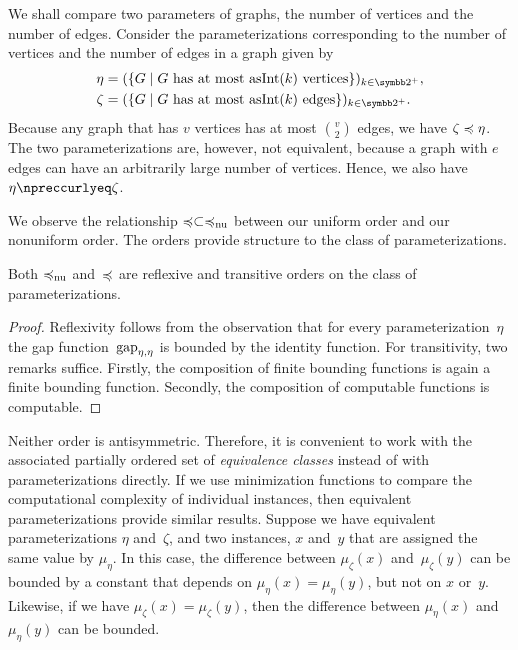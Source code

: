 \begin{example}
  We shall compare two parameters of graphs, the number of vertices and the number of edges.
  Consider the parameterizations corresponding to the number of vertices and the number of edges in a graph given by
  \begin{align*}
    \eta &= (\{G \st \text{$G$ has at most $\asNat(k)$ vertices}\})_{k \in \binary^+}, \\
    \zeta &= (\{G \st \text{$G$ has at most $\asNat(k)$ edges}\})_{k \in \binary^+}.
  \end{align*}
  Because any graph that has $v$ vertices has at most $\binom{v}{2}$ edges, we have $\zeta \preccurlyeq \eta$.
  The two parameterizations are, however, not equivalent, because a graph with $e$ edges can have an arbitrarily large number of vertices.
  Hence, we also have $\eta \notquasile \zeta$.
\end{example}

We observe the relationship $\preccurlyeq \subset \preccurlyeq_\mathrm{nu}$ between our uniform order and our nonuniform order.
The orders provide structure to the class of parameterizations.
\begin{lemma}
\label{lem:preorder}%
  Both $\preccurlyeq_\mathrm{nu}$ and~$\preccurlyeq$ are reflexive and transitive orders on the class of parameterizations.
\end{lemma}
\begin{proof}
  Reflexivity follows from the observation that for every parameterization~$\eta$ the gap function~$\operatorname{gap}_{\eta, \eta}$ is bounded by the identity function.
  For transitivity, two remarks suffice.
  Firstly, the composition of finite bounding functions is again a finite bounding function.
  Secondly, the composition of computable functions is computable.
\end{proof}

Neither order is antisymmetric.
Therefore, it is convenient to work with the associated partially ordered set of \emph{equivalence classes} instead of with parameterizations directly.
If we use minimization functions to compare the computational complexity of individual instances, then equivalent parameterizations provide similar results.
Suppose we have equivalent parameterizations $\eta$ and~$\zeta$, and two instances, $x$ and~$y$ that are assigned the same value by $\mu_\eta$.
In this case, the difference between $\mu_\zeta(x)$ and~$\mu_\zeta(y)$ can be bounded by a constant that depends on $\mu_\eta(x) = \mu_\eta(y)$, but not on $x$ or~$y$.
Likewise, if we have $\mu_\zeta(x) = \mu_\zeta(y)$, then the difference between $\mu_\eta(x)$ and~$\mu_\eta(y)$ can be bounded.

